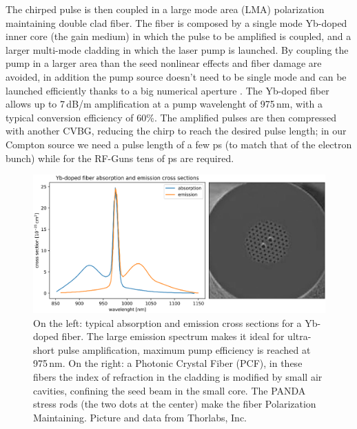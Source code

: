 The chirped pulse is then coupled in a large mode area (LMA) polarization maintaining double clad fiber. The fiber is composed by a single mode Yb-doped inner core (the gain medium) in which the pulse to be amplified is coupled, and a larger multi-mode cladding in which the laser pump is launched. By coupling the pump in a larger area than the seed nonlinear effects and fiber damage are avoided, in addition the pump source doesn't need to be single mode and can be launched efficiently thanks to a big numerical aperture \parencite{Paschotta1997}. The Yb-doped fiber allows up to 7\,dB/m amplification at a pump wavelenght of 975\,nm, with a typical conversion efficiency of 60\%.
The amplified pulses are then compressed with another CVBG, reducing the chirp to reach the desired pulse length; in our Compton source we need a pulse length of a few ps (to match that of the electron bunch) while for the RF-Guns tens of ps are required.
\begin{figure}
	\centering
	\includegraphics[width=0.9\linewidth]{images/ybfiber.eps}
	\caption{On the left: typical absorption and emission cross sections for a Yb-doped fiber. The large emission spectrum makes it ideal for ultra-short pulse amplification, maximum pump efficiency is reached at 975\,nm. On the right: a Photonic Crystal Fiber (PCF), in these fibers the index of refraction in the cladding is modified by small air cavities, confining the seed beam in the small core. The PANDA stress rods (the two dots at the center) make the fiber Polarization Maintaining. Picture and data from Thorlabs, Inc.}
	\label{fig:ybfiber}
\end{figure}

